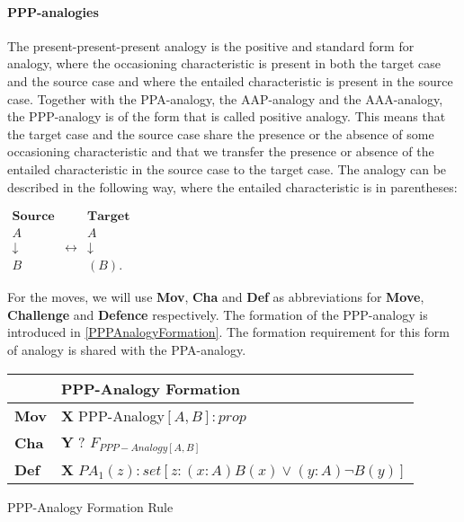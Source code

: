 			\paragraph{PPP-analogies}
			
				The present-present-present analogy is the positive and standard form for analogy, where the occasioning characteristic is present in both the target case and the source case and where the entailed characteristic is present in the source case. Together with the PPA-analogy, the AAP-analogy and the AAA-analogy, the PPP-analogy is of the form that is called positive analogy. This means that the target case and the source case share the presence or the absence of some occasioning characteristic and that we transfer the presence or absence of the entailed characteristic in the source case to the target case. The analogy can be described in the following way, where the entailed characteristic is in parentheses:
                	\begin{table}[H]
                	\centering	
                	$
                    \begin{array}{ccc}
                    	\textbf{Source} &                 & \textbf{Target} \\
                    	A               &  & A               \\
                    	\downarrow      & \leftrightarrow & \downarrow      \\
                    	B               &  & (B).
                    \end{array}
               	 	$
               	 	\end{table}
               	 For the moves, we will use \textbf{Mov}, \textbf{Cha} and \textbf{Def} as abbreviations for \textbf{Move}, \textbf{Challenge} and \textbf{Defence} respectively. The formation of the PPP-analogy is introduced in \autoref{PPPAnalogyFormation}. The formation requirement for this form of analogy is shared with the PPA-analogy. 
               	 	
               		\begin{Scheme}[H]\footnotesize
               		\centering
               		\begin{tabular}{l l} 
               			                   & \textbf{PPP-Analogy Formation} \\ \toprule
               			\textbf{Mov}      & \textbf{X} PPP-Analogy$[A,B] : prop$ \\ \midrule
               			\textbf{Cha} & \textbf{Y} ? $F_{PPP-Analogy[A,B]}$ \\ \midrule
               			\textbf{Def}   & \textbf{X} $PA_1(z) : set [z : (x : A)B(x) \lor (y : A) \neg B(y)]$ \\ \bottomrule
               		\end{tabular}
               		\caption{PPP-Analogy Formation Rule}
               		\label{PPPAnalogyFormation}
					\end{Scheme}               	 
               	 	
